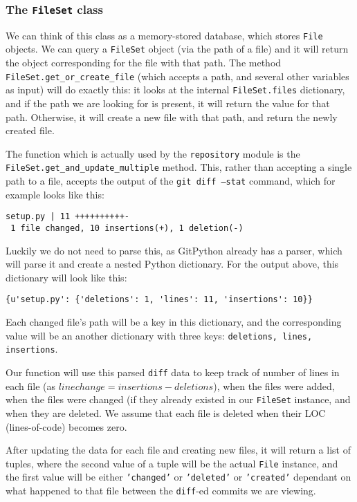 \documentclass[12pt,twoside,notitlepage]{report}
\begin{document}
\subsubsection*{The \texttt{FileSet} class}
We can think of this class as a memory-stored database, which stores \texttt{File} objects. We can query a \texttt{FileSet} object (via the path of a file) and it will return the object corresponding for the file with that path. The method \texttt{FileSet.get\_or\_create\_file} (which accepts a path, and several other variables as input) will do exactly this: it looks at the internal \texttt{FileSet.files} dictionary, and if the path we are looking for is present, it will return the value for that path. Otherwise, it will create a new file with that path, and return the newly created file.

The function which is actually used by the \texttt{repository} module is the \texttt{FileSet.get\_and\_update\_multiple} method. This, rather than accepting a single path to a file, accepts the output of the \texttt{git diff --stat} command, which for example looks like this:
\begin{verbatim}
setup.py | 11 ++++++++++-
 1 file changed, 10 insertions(+), 1 deletion(-)
\end{verbatim}
Luckily we do not need to parse this, as GitPython already has a parser, which will parse it and create a nested Python dictionary. For the output above, this dictionary will look like this:
\begin{verbatim}
{u'setup.py': {'deletions': 1, 'lines': 11, 'insertions': 10}}
\end{verbatim}
Each changed file's path will be a key in this dictionary, and the corresponding value will be an another dictionary with three keys: \texttt{deletions, lines, insertions}. 

Our function will use this parsed \texttt{diff} data to keep track of number of lines in each file (as $linechange = insertions - deletions$), when the files were added, when the files were changed (if they already existed in our \texttt{FileSet} instance, and when they are deleted. We assume that each file is deleted when their LOC (lines-of-code) becomes zero.

After updating the data for each file and creating new files, it will return a list of tuples, where the second value of a tuple will be the actual \texttt{File} instance, and the first value will be either \texttt{'changed'} or \texttt{'deleted'} or \texttt{'created'} dependant on what happened to that file between the \texttt{diff}-ed commits we are viewing.
\end{document}
